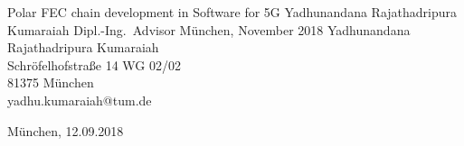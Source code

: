\documentclass{LNTthesis}
\begin{document}
    {Polar FEC chain development in Software for 5G}                  %
    {Yadhunandana Rajathadripura Kumaraiah}                  %
    {Dipl.-Ing.~Advisor}                %
    {M\"unchen, November 2018}          %
    {Yadhunandana Rajathadripura Kumaraiah\\                 %
    Schr\"ofelhofstra\ss e 14 WG 02/02\\
    81375 M\"unchen\\
    yadhu.kumaraiah@tum.de}

    {M\"unchen, 12.09.2018}         %

\cleardoubleemptypage   %


    \setcounter{page}{1}

        \tableofcontents    %
        \listoffigures      %
        \listoftables       %
        \cleardoubleemptypage   %


    \setcounter{page}{1}

        
\end{document}
